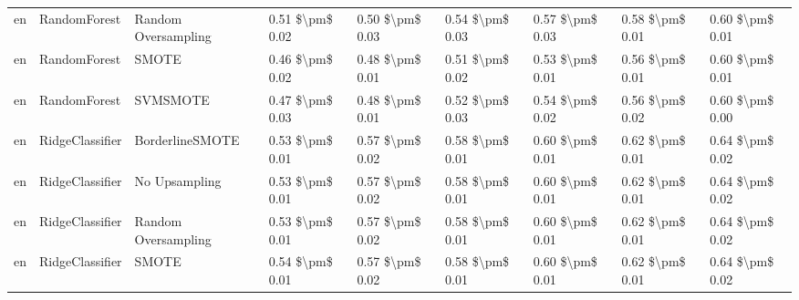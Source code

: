 \begin{tabular}{lllllllll}
      en &                    RandomForest &           Random Oversampling &     0.51 \$\textbackslash pm\$ 0.02 &           0.50 \$\textbackslash pm\$ 0.03 &       0.54 \$\textbackslash pm\$ 0.03 &        0.57 \$\textbackslash pm\$ 0.03 &                         0.58 \$\textbackslash pm\$ 0.01 &     0.60 \$\textbackslash pm\$ 0.01 \\
      en &                    RandomForest &                         SMOTE &     0.46 \$\textbackslash pm\$ 0.02 &           0.48 \$\textbackslash pm\$ 0.01 &       0.51 \$\textbackslash pm\$ 0.02 &        0.53 \$\textbackslash pm\$ 0.01 &                         0.56 \$\textbackslash pm\$ 0.01 &     0.60 \$\textbackslash pm\$ 0.01 \\
      en &                    RandomForest &                      SVMSMOTE &     0.47 \$\textbackslash pm\$ 0.03 &           0.48 \$\textbackslash pm\$ 0.01 &       0.52 \$\textbackslash pm\$ 0.03 &        0.54 \$\textbackslash pm\$ 0.02 &                         0.56 \$\textbackslash pm\$ 0.02 &     0.60 \$\textbackslash pm\$ 0.00 \\
      en &                 RidgeClassifier &               BorderlineSMOTE &     0.53 \$\textbackslash pm\$ 0.01 &           0.57 \$\textbackslash pm\$ 0.02 &       0.58 \$\textbackslash pm\$ 0.01 &        0.60 \$\textbackslash pm\$ 0.01 &                         0.62 \$\textbackslash pm\$ 0.01 &     0.64 \$\textbackslash pm\$ 0.02 \\
      en &                 RidgeClassifier &                 No Upsampling &     0.53 \$\textbackslash pm\$ 0.01 &           0.57 \$\textbackslash pm\$ 0.02 &       0.58 \$\textbackslash pm\$ 0.01 &        0.60 \$\textbackslash pm\$ 0.01 &                         0.62 \$\textbackslash pm\$ 0.01 &     0.64 \$\textbackslash pm\$ 0.02 \\
      en &                 RidgeClassifier &           Random Oversampling &     0.53 \$\textbackslash pm\$ 0.01 &           0.57 \$\textbackslash pm\$ 0.02 &       0.58 \$\textbackslash pm\$ 0.01 &        0.60 \$\textbackslash pm\$ 0.01 &                         0.62 \$\textbackslash pm\$ 0.01 &     0.64 \$\textbackslash pm\$ 0.02 \\
      en &                 RidgeClassifier &                         SMOTE &     0.54 \$\textbackslash pm\$ 0.01 &           0.57 \$\textbackslash pm\$ 0.02 &       0.58 \$\textbackslash pm\$ 0.01 &        0.60 \$\textbackslash pm\$ 0.01 &                         0.62 \$\textbackslash pm\$ 0.01 &     0.64 \$\textbackslash pm\$ 0.02 \\

\end{tabular}
